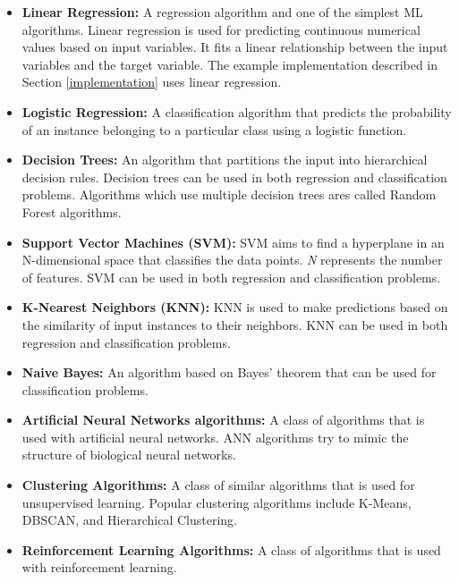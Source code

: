 \begin{itemize}
  \item \textbf{Linear Regression:} A regression algorithm and one of the simplest ML algorithms. Linear regression is used for predicting continuous numerical values based on input variables. It fits a linear relationship between the input variables and the target variable. The example implementation described in Section \ref{implementation} uses linear regression.
  \item \textbf{Logistic Regression:} A classification algorithm that predicts the probability of an instance belonging to a particular class using a logistic function.
  \item \textbf{Decision Trees:} An algorithm that partitions the input into hierarchical decision rules. Decision trees can be used in both regression and classification problems. Algorithms which use multiple decision trees ares called Random Forest algorithms.
  \item \textbf{Support Vector Machines (SVM):} SVM aims to find a hyperplane in an N-dimensional space that classifies the data points. \textit{N} represents the number of features. SVM can be used in both regression and classification problems.
  \item \textbf{K-Nearest Neighbors (KNN):} KNN is used to make predictions based on the similarity of input instances to their neighbors. KNN can be used in both regression and classification problems.
  \item \textbf{Naive Bayes:} An algorithm based on Bayes' theorem that can be used for classification problems.
  \item \textbf{Artificial Neural Networks algorithms:} A class of algorithms that is used with artificial neural networks. ANN algorithms try to mimic the structure of biological neural networks.
  \item \textbf{Clustering Algorithms:} A class of similar algorithms that is used for unsupervised learning. Popular clustering algorithms include K-Means, DBSCAN, and Hierarchical Clustering.
  \item \textbf{Reinforcement Learning Algorithms:}  A class of algorithms that is used with reinforcement learning.
\end{itemize}